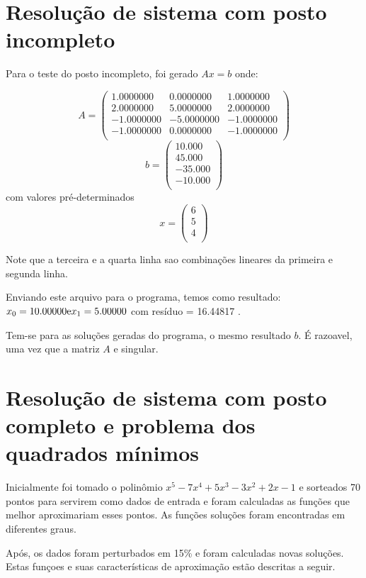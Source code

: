

\chapter{Resolução de sistema com posto incompleto}
Para o teste do posto incompleto, foi gerado $Ax = b$ onde:


\[
A =
\left(
\begin{array}{ccc}
	1.0000000 & 0.0000000 & 1.0000000\\
	2.0000000 & 5.0000000 & 2.0000000\\
	-1.0000000 & -5.0000000 & -1.0000000\\
	-1.0000000 & 0.0000000 & -1.0000000\\
\end{array}
\right)
\]
\[
b =
\left(
\begin{array}{c}
10.000  \\
45.000  \\
-35.000  \\
-10.000  \\
\end{array}\right)    
\]
com valores pré-determinados\[ x = 
\left(
\begin{array}{c}
6\\
5\\
4\\
\end{array}
\right)\]

Note que a terceira e a quarta linha sao combinações lineares da primeira e segunda linha.

Enviando este arquivo para o programa, temos como resultado:
\(x_0 = 10.00000 $e$ x_1 = 5.00000 \) com resíduo = 16.44817 .

Tem-se para as soluções geradas do programa, o mesmo resultado $b$. É razoavel, 
uma vez que a matriz $A$ e singular. 


\chapter{Resolução de sistema com posto completo e problema dos quadrados mínimos}
Inicialmente foi tomado o polinômio $x^5-7x^4+5x^3-3x^2+2x-1$ e sorteados
70 pontos para servirem como  dados de entrada e foram calculadas as funções que
melhor aproximariam esses pontos.
As funções soluções foram encontradas em diferentes graus. 

Após, os dados foram perturbados em 15\% e foram calculadas novas
soluções. Estas funçoes e suas características de aproximação estão descritas 
a seguir.

